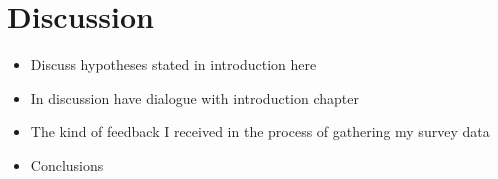 \section{Discussion}
\justify
\begin{itemize}
  \item Discuss hypotheses stated in introduction here
  \item In discussion have dialogue with introduction chapter
  \item The kind of feedback I received in the process of gathering my survey data
  \item Conclusions
\end{itemize}